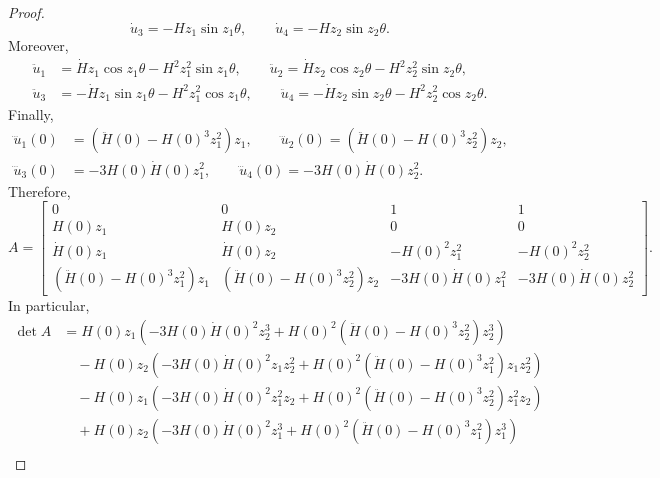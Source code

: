 \documentclass[10pt,a4paper]{amsart}
\begin{document}
\begin{proof}
\begin{equation*}
\dot u_3= -Hz_1\sin z_1 \theta,\qquad
\dot u_4=-Hz_2\sin z_2\theta.
\end{equation*}
Moreover,
\begin{align*}
\ddot u_1&=\dot Hz_1\cos z_1\theta-H^2z_1^2\sin z_1 \theta,\qquad \ddot u_2=\dot Hz_2\cos z_2\theta-H^2z_2^2\sin z_2 \theta,\\
\ddot u_3&=-\dot Hz_1\sin z_1\theta-H^2z_1^2\cos z_1 \theta,\qquad \ddot u_4=-\dot Hz_2\sin z_2\theta-H^2z_2^2\cos z_2 \theta.
\end{align*}
Finally,
\begin{align*}
\dddot u_1(0)&=\left(\ddot H(0)-H(0)^3z_1^2\right)z_1,\qquad  \dddot u_2(0)=\left(\ddot H(0)-H(0)^3z_2^2\right)z_2,\\
\dddot u_3(0)&=-3H(0)\dot H(0)z_1^2,\qquad  \dddot u_4(0)=-3H(0)\dot H(0)z_2^2.
\end{align*}
Therefore, 
\begin{equation*}
A=\begin{bmatrix}
	0 & 0 & 1 & 1 \\
	H(0)z_1 & H(0)z_2 & 0 & 0 \\
	\dot H(0)z_1 & \dot H(0)z_2 & -H(0)^2z_1^2 & -H(0)^2z_2^2 \\
	\left(\ddot H(0)-H(0)^3z_1^2\right)z_1 & \left(\ddot H(0)-H(0)^3z_2^2\right)z_2 & -3H(0)\dot H(0)z_1^2 & -3H(0)\dot H(0)z_2^2
\end{bmatrix}.
\end{equation*}
In particular,
\begin{equation*}
\begin{split}
	\det A &=H(0)z_1\left(-3H(0)\dot H(0)^2z_2^3+ H(0)^2\left(\ddot H(0)-H(0)^3z_2^2\right)z_2^3\right)\\
	&\quad- H(0)z_2\left(-3H(0)\dot H(0)^2z_1z_2^2+ H(0)^2\left(\ddot H(0)-H(0)^3z_1^2\right)z_1z_2^2\right)\\
	&\quad-H(0)z_1\left(-3H(0)\dot H(0)^2z_1^2z_2+ H(0)^2\left(\ddot H(0)-H(0)^3z_2^2\right)z_1^2z_2\right)\\
	&\quad+ H(0)z_2\left(-3H(0)\dot H(0)^2z_1^3+ H(0)^2\left(\ddot H(0)-H(0)^3z_1^2\right)z_1^3\right)\\

\end{split}
\end{equation*}
\end{proof}
\end{document}
